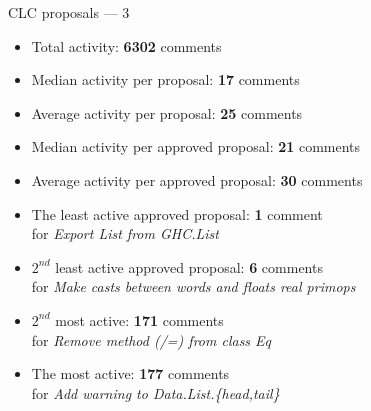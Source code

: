\documentclass[handout]{beamer}
\begin{document}
\begin{frame}{CLC proposals --- 3}
\begin{itemize}[<+->]

\def\tt{}

\item Total activity: {\bf 6302} comments
\item Median  activity per proposal:          {\bf 17} comments
\item Average activity per proposal:          {\bf 25} comments
\item Median  activity per approved proposal: {\bf 21} comments
\item Average activity per approved proposal: {\bf 30} comments
\item The least active approved proposal:
   {\bf 1} comment \\ for {\it Export {\tt List} from {\tt GHC.List}}
\item $2^{nd}$ least active approved proposal:
   {\bf 6} comments \\ for {\it Make casts between words and floats real primops}
\item $2^{nd}$ most active:
   {\bf 171} comments \\ for {\it Remove method {\tt (/=)} from class {\tt Eq}}
\item The most active:
   {\bf 177} comments \\ for {\it Add warning to {\tt Data.List.\{head,tail\}}}




\end{itemize}
\end{frame}
\end{document}
